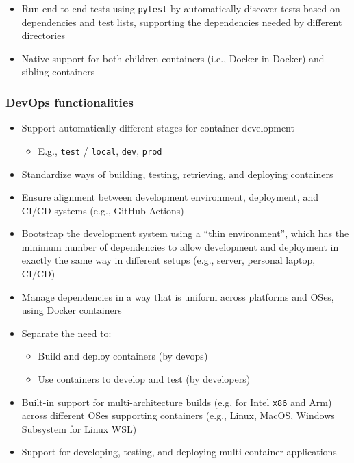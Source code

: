 \begin{itemize}
  \item Run end-to-end tests using \texttt{pytest} by automatically
    discover tests based on dependencies and test lists, supporting the
    dependencies needed by different directories

  \item Native support for both children-containers (i.e., Docker-in-Docker)
    and sibling containers
\end{itemize}

\subsubsection{DevOps functionalities}

\begin{itemize}
  \item Support automatically different stages for container development

    \begin{itemize}
      \item E.g., \texttt{test} / \texttt{local}, \texttt{dev},
        \texttt{prod}
    \end{itemize}

  \item Standardize ways of building, testing, retrieving, and
    deploying containers

  \item Ensure alignment between development environment, deployment, and
    CI/CD systems (e.g., GitHub Actions)

  \item Bootstrap the development system using a ``thin environment'',
    which has the minimum number of dependencies to allow development
    and deployment in exactly the same way in different setups (e.g., server,
    personal laptop, CI/CD)

  \item Manage dependencies in a way that is uniform across platforms and
    OSes, using Docker containers

  \item Separate the need to:

    \begin{itemize}
      \item Build and deploy containers (by devops)

      \item Use containers to develop and test (by developers)
    \end{itemize}

  \item Built-in support for multi-architecture builds (e.g, for Intel
    \texttt{x86} and Arm) across different OSes supporting containers (e.g.,
    Linux, MacOS, Windows Subsystem for Linux WSL)

  \item Support for developing, testing, and deploying multi-container
    applications
\end{itemize}

